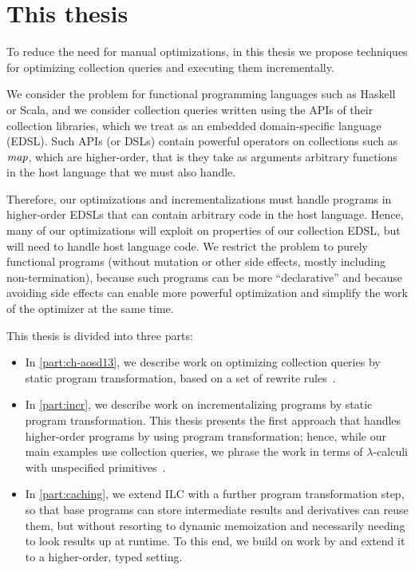 \section{This thesis}
To reduce the need for manual optimizations, in this thesis we propose
techniques for optimizing collection queries and executing them
incrementally.

We consider the problem for functional programming languages such as Haskell or
Scala, and we consider collection queries written using the APIs of their
collection libraries, which we treat as an embedded domain-specific language (EDSL). Such
APIs (or DSLs) contain powerful operators on collections such as $\mathit{map}$,
which are higher-order, that
is they take as arguments arbitrary functions in the host language that we must
also handle.

Therefore, our optimizations and incrementalizations must handle programs in
higher-order EDSLs that can contain arbitrary code in the host language. Hence,
many of our optimizations will exploit on properties of our collection EDSL, but
will need to handle host language code. We restrict the problem to purely
functional programs (without mutation or other side effects, mostly including
non-termination), because such programs can be more ``declarative'' and because
avoiding side effects can enable more powerful optimization and simplify the
work of the optimizer at the same time.

This thesis is divided into three parts:
\begin{itemize}
\item In \cref{part:ch-aosd13}, we describe work on optimizing collection
  queries by static program transformation, based on a set of rewrite rules~\citep{GiarrussoAOSD13}.
\item In \cref{part:incr}, we describe work on incrementalizing programs
  by static program transformation. This thesis presents the first approach that
  handles higher-order programs by using program transformation; hence, while
  our main examples use collection queries, we phrase the work in terms of
  $\lambda$-calculi with unspecified primitives~\citep*{CaiEtAl2014ILC}.
\item In \cref{part:caching}, we extend ILC with a further program transformation
  step, so that base programs can store intermediate results and derivatives can
  reuse them, but without resorting to dynamic memoization and necessarily
  needing to look results up at runtime. To this end, we build on work by
\citet{Liu00} and extend it to a higher-order, typed setting.
\end{itemize}

